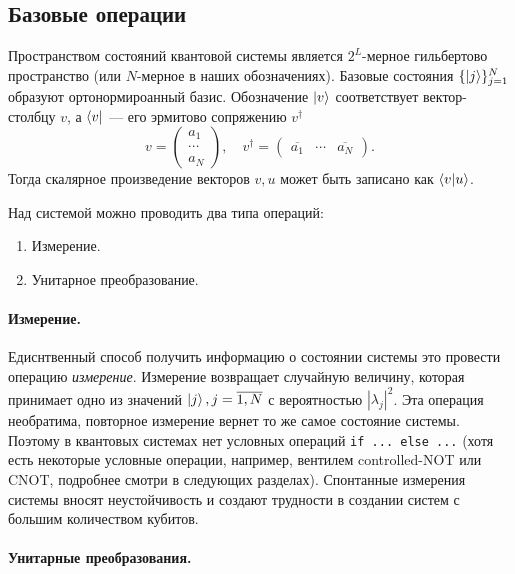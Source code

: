 \documentclass{article}
\theoremstyle{definition}
\begin{document}
\subsection{Базовые операции}

Пространством состояний квантовой системы является $2^L$-мерное гильбертово пространство
(или $N$-мерное в наших обозначениях).
Базовые состояния $\{\ket{j}\}_{j=1}^N$ образуют ортонормироанный базис.
Обозначение $\ket{v}$ соответствует вектор-столбцу $v$, а $\bra{v}$ --- его эрмитово сопряжению $v^\dag$
\[
    v = \begin{pmatrix}
    a_1 \\
    \cdots \\
    a_N 
    \end{pmatrix},
    \quad
    v^\dag = \begin{pmatrix} \overline{a_1} & \cdots & \overline{a_N} \end{pmatrix}.
\]
Тогда скалярное произведение векторов $v, u$ может быть записано как $\bra{v}\ket{u}$.

Над системой можно проводить два типа операций:
\begin{enumerate}
    \item Измерение.
    \item Унитарное преобразование.
\end{enumerate}

\paragraph*{Измерение.}
Едиснтвенный способ получить информацию о состоянии системы это провести операцию {\em измерение}.
Измерение возвращает случайную величину, которая принимает одно из значений $\ket{j}, j=\overline{1, N}$
с вероятностью $|\lambda_j|^2$.
Эта операция необратима, повторное измерение вернет то же самое состояние системы.
Поэтому в квантовых системах нет условных операций \texttt{if ... else ...} (хотя есть некоторые условные операции, например, вентилем controlled-NOT или CNOT, подробнее смотри в следующих разделах).
Спонтанные измерения системы вносят неустойчивость и создают трудности в создании систем с большим количеством кубитов.

\paragraph*{Унитарные преобразования.}
\end{document}
